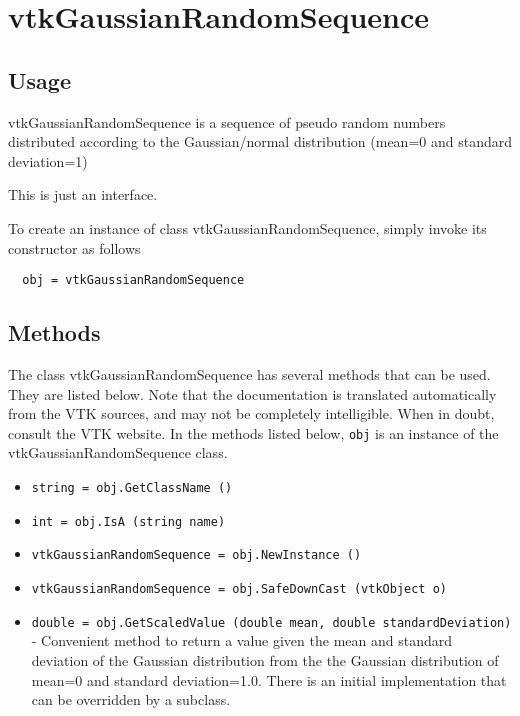 \section{vtkGaussianRandomSequence}

\subsection{Usage}

 vtkGaussianRandomSequence is a sequence of pseudo random numbers
 distributed according to the Gaussian/normal distribution (mean=0 and
 standard deviation=1)

 This is just an interface.

To create an instance of class vtkGaussianRandomSequence, simply
invoke its constructor as follows
\begin{verbatim}
  obj = vtkGaussianRandomSequence
\end{verbatim}
\subsection{Methods}

The class vtkGaussianRandomSequence has several methods that can be used.
  They are listed below.
Note that the documentation is translated automatically from the VTK sources,
and may not be completely intelligible.  When in doubt, consult the VTK website.
In the methods listed below, \verb|obj| is an instance of the vtkGaussianRandomSequence class.
\begin{itemize}
\item  \verb|string = obj.GetClassName ()|

\item  \verb|int = obj.IsA (string name)|

\item  \verb|vtkGaussianRandomSequence = obj.NewInstance ()|

\item  \verb|vtkGaussianRandomSequence = obj.SafeDownCast (vtkObject o)|

\item  \verb|double = obj.GetScaledValue (double mean, double standardDeviation)| -  Convenient method to return a value given the mean and standard deviation
 of the Gaussian distribution from the the Gaussian distribution of mean=0
 and standard deviation=1.0. There is an initial implementation that can
 be overridden by a subclass.

\end{itemize}

